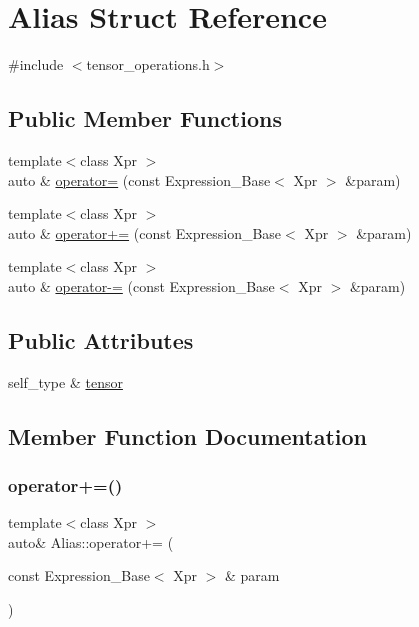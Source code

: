 \hypertarget{structAlias}{}\section{Alias Struct Reference}
\label{structAlias}


{\ttfamily \#include $<$tensor\+\_\+operations.\+h$>$}

\subsection*{Public Member Functions}
\begin{DoxyCompactItemize}
\item 
{\footnotesize template$<$class Xpr $>$ }\\auto \& \hyperlink{structAlias_a18a1108238e76db0d138ecb26d57aa80}{operator=} (const Expression\+\_\+\+Base$<$ Xpr $>$ \&param)
\item 
{\footnotesize template$<$class Xpr $>$ }\\auto \& \hyperlink{structAlias_ac6d72bf7f3507b3b0cec0858895fd049}{operator+=} (const Expression\+\_\+\+Base$<$ Xpr $>$ \&param)
\item 
{\footnotesize template$<$class Xpr $>$ }\\auto \& \hyperlink{structAlias_a005fd967ffd4094b6598da0280fa3fed}{operator-\/=} (const Expression\+\_\+\+Base$<$ Xpr $>$ \&param)
\end{DoxyCompactItemize}
\subsection*{Public Attributes}
\begin{DoxyCompactItemize}
\item 
self\+\_\+type \& \hyperlink{structAlias_a17791174eae7fd8077e650ed61c668dc}{tensor}
\end{DoxyCompactItemize}


\subsection{Member Function Documentation}
\mbox{\label{structAlias_ac6d72bf7f3507b3b0cec0858895fd049}} 
\subsubsection{\texorpdfstring{operator+=()}{operator+=()}}
{\footnotesize\ttfamily template$<$class Xpr $>$ \\
auto\& Alias\+::operator+= (\begin{DoxyParamCaption}\item[{const Expression\+\_\+\+Base$<$ Xpr $>$ \&}]{param }\end{DoxyParamCaption})\hspace{0.3cm}{\ttfamily [inline]}}

